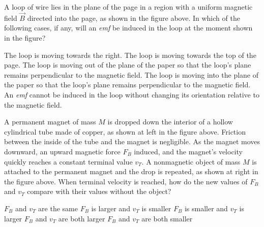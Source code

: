 \documentclass{../../../oss-apphys-exam}
\begin{document}
\begin{questions}
  \question A loop of wire lies in the plane of the page in a region with a
  uniform magnetic field $\vec B$ directed into the page, as shown in the figure
  above. In which of the following cases, if any, will an \emph{emf} be induced
  in the loop at the moment shown in the figure?
  \begin{choices}
    \choice The loop is moving towards the right.
    \choice The loop is moving towards the top of the page.
    \choice The loop is moving out of the plane of the paper so that the loop's
    plane remains perpendicular to the magnetic field.
    \choice The loop is moving into the plane of the paper so that the loop's
    plane remains perpendicular to the magnetic field.
    \choice An \emph{emf} cannot be induced in the loop without changing its
    orientation relative to the magnetic field.
  \end{choices}
  
  \question A permanent magnet of mass $M$ is dropped down the interior of a
  hollow cylindrical tube made of copper, as shown at left in the figure above.
  Friction between the inside of the tube and the magnet is negligible. As the
  magnet moves downward, an upward magnetic force $F_B$ induced, and the
  magnet's velocity quickly reaches a constant terminal value $v_T$. A
  nonmagnetic object of mass $M$ is attached to the permanent magnet and the
  drop is repeated, as shown at right in the figure above. When terminal
  velocity is reached, how do the new values of $F_B$ and $v_T$ compare with
  their values without the object?
  \begin{choices}
    \choice $F_B$ and $v_T$ are the same
    \choice $F_B$ is larger and $v_T$ is smaller
    \choice $F_B$ is smaller and $v_T$ is larger
    \choice $F_B$ and $v_T$ are both larger
    \choice $F_B$ and $v_T$ are both smaller
  \end{choices}


\end{questions}
\end{document}
